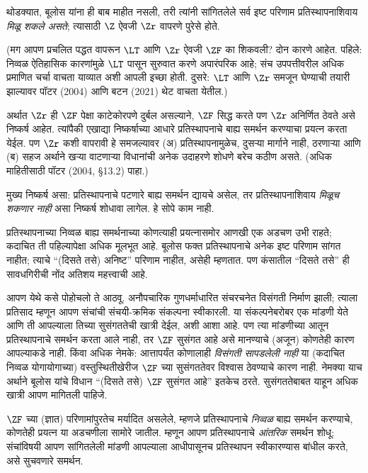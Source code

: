 थोडक्यात, बूलोस यांना ही बाब माहीत नसली, तरी त्यांनी सांगितलेले सर्व इष्ट परिणाम प्रतिस्थापनाशिवाय \emph{मिळू शकले असते}; त्यासाठी $\Z$ ऐवजी $\Zr$ वापरणे पुरेसे होते.

(मग आपण प्रचलित पद्धत वापरून $\LT$ आणि $\Zr$ ऐवजी $\ZF$ का शिकवली? दोन कारणे आहेत. पहिले: निव्वळ ऐतिहासिक कारणांमुळे $\LT$ पासून सुरुवात करणे अपारंपरिक आहे; संच उपपत्तीवरील अधिक प्रमाणित चर्चा वाचता याव्यात अशी आपली इच्छा होती. दुसरे: $\LT$ आणि $\Zr$ समजून घेण्याची तयारी झाल्यावर पॉटर (2004) आणि बटन (2021) थेट वाचता येतील.)

अर्थात $\Zr$ ही $\ZF$ पेक्षा काटेकोरपणे दुर्बल असल्याने, $\ZF$ सिद्ध करते पण $\Zr$ अनिर्णित ठेवते असे निष्कर्ष आहेत. त्यांपैकी एखाद्या निष्कर्षाच्या आधारे प्रतिस्थापनाचे बाह्य समर्थन करण्याचा प्रयत्न करता येईल. पण $\Zr$ कशी वापरावी हे समजल्यावर (अ) प्रतिस्थापनामुळेच, दुसऱ्या मार्गाने नाही, ठरणाऱ्या आणि (ब) सहज अर्थाने खऱ्या वाटणाऱ्या विधानांची अनेक उदाहरणे शोधणे बरेच कठीण असते. (अधिक माहितीसाठी पॉटर (2004, \S13.2) पाहा.)

मुख्य निष्कर्ष असा: प्रतिस्थापनाचे पटणारे बाह्य समर्थन द्यायचे असेल, तर प्रतिस्थापनाशिवाय \emph{मिळूच शकणार नाही} असा निष्कर्ष शोधावा लागेल. हे सोपे काम नाही.

प्रतिस्थापनाच्या निव्वळ बाह्य समर्थनाच्या कोणत्याही प्रयत्नासमोर आणखी एक अडचण उभी राहते; कदाचित ती पहिल्यापेक्षा अधिक मूलभूत आहे. बूलोस फक्त प्रतिस्थापनाचे अनेक इष्ट परिणाम सांगत नाहीत; त्याचे ``(दिसते तसे) अनिष्ट'' परिणाम नाहीत, असेही म्हणतात. पण कंसातील ``दिसते तसे'' ही सावधगिरीची नोंद अतिशय महत्त्वाची आहे.

आपण येथे कसे पोहोचलो ते आठवू. अनौपचारिक गुणधर्माधारित संचरचनेत विसंगती निर्माण झाली; त्याला प्रतिसाद म्हणून आपण संचांची संचयी-क्रमिक संकल्पना स्वीकारली. या संकल्पनेबरोबर एक मांडणी येते आणि ती आपल्याला तिच्या सुसंगततेची खात्री देईल, अशी आशा आहे. पण त्या मांडणीच्या आतून प्रतिस्थापनाचे समर्थन करता आले नाही, तर $\ZF$ सुसंगत आहे असे मानण्याचे (अजून) कोणतेही कारण आपल्याकडे नाही. किंवा अधिक नेमके: आत्तापर्यंत कोणालाही \emph{विसंगती सापडलेली नाही} या (कदाचित निव्वळ योगायोगाच्या) वस्तुस्थितीखेरीज $\ZF$ च्या सुसंगततेवर विश्वास ठेवण्याचे कारण नाही. नेमक्या याच अर्थाने बूलोस यांचे विधान ``(दिसते तसे) $\ZF$ सुसंगत आहे'' इतकेच ठरते. सुसंगततेबाबत याहून अधिक खात्री आपण मागितली पाहिजे.

$\ZF$ च्या (ज्ञात) परिणामांपुरतेच मर्यादित असलेले, म्हणजे प्रतिस्थापनाचे \emph{निव्वळ} बाह्य समर्थन करण्याचे, कोणतेही प्रयत्न या अडचणीला सामोरे जातील. म्हणून आपण प्रतिस्थापनाचे \emph{आंतरिक} समर्थन शोधू: संचांविषयी आपण सांगितलेली मांडणी आपल्याला आधीपासूनच प्रतिस्थापन स्वीकारण्यास बांधील करते, असे सुचवणारे समर्थन.








